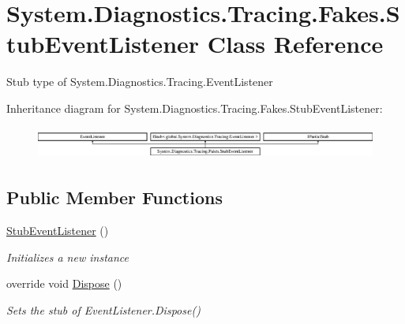 \hypertarget{class_system_1_1_diagnostics_1_1_tracing_1_1_fakes_1_1_stub_event_listener}{\section{System.\-Diagnostics.\-Tracing.\-Fakes.\-Stub\-Event\-Listener Class Reference}
\label{class_system_1_1_diagnostics_1_1_tracing_1_1_fakes_1_1_stub_event_listener}
}


Stub type of System.\-Diagnostics.\-Tracing.\-Event\-Listener 


Inheritance diagram for System.\-Diagnostics.\-Tracing.\-Fakes.\-Stub\-Event\-Listener\-:\begin{figure}[H]
\begin{center}
\leavevmode
\includegraphics[height=1.075889cm]{class_system_1_1_diagnostics_1_1_tracing_1_1_fakes_1_1_stub_event_listener}
\end{center}
\end{figure}
\subsection*{Public Member Functions}
\begin{DoxyCompactItemize}
\item 
\hyperlink{class_system_1_1_diagnostics_1_1_tracing_1_1_fakes_1_1_stub_event_listener_ae9026f7dbc6b0140dc9f05219a793c60}{Stub\-Event\-Listener} ()
\begin{DoxyCompactList}\small\item\em Initializes a new instance\end{DoxyCompactList}\item 
override void \hyperlink{class_system_1_1_diagnostics_1_1_tracing_1_1_fakes_1_1_stub_event_listener_aab62e9e15970534ff37a7b4ab43c0483}{Dispose} ()
\begin{DoxyCompactList}\small\item\em Sets the stub of Event\-Listener.\-Dispose()\end{DoxyCompactList}\end{DoxyCompactItemize}

